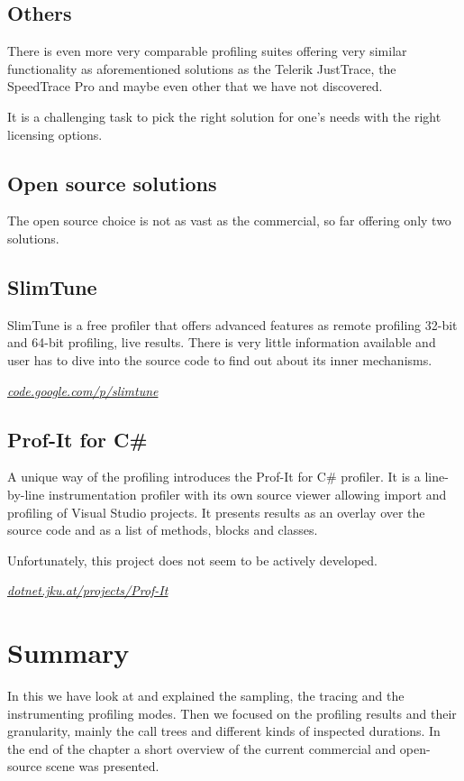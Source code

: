 \subsection{Others}
There is even more very comparable profiling suites offering very similar functionality as aforementioned solutions as the Telerik JustTrace, the SpeedTrace Pro and maybe even other that we have not discovered.

It is a challenging task to pick the right solution for one's needs with the right licensing options.

\subsection*{Open source solutions}
The open source choice is not as vast as the commercial, so far offering only two solutions.

\subsection{SlimTune}
SlimTune is a free profiler that offers advanced features as remote profiling 32-bit and 64-bit profiling, live results. There is very little information available and user has to dive into the source code to find out about its inner mechanisms.

\textit{\href{http://code.google.com/p/slimtune}{code.google.com/p/slimtune}}

\subsection{Prof-It for C\#}
A unique way of the profiling introduces the Prof-It for C\# profiler. It is a line-by-line instrumentation profiler with its own source viewer allowing import and profiling of Visual Studio projects. It presents results as an overlay over the source code and as a list of methods, blocks and classes. 

Unfortunately, this project does not seem to be actively developed. 

\textit{\href{http://dotnet.jku.at/projects/Prof-It/}{dotnet.jku.at/projects/Prof-It}}

\section*{Summary}
In this we have look at and explained the sampling, the tracing and the instrumenting profiling modes. Then we focused on the profiling results and their granularity, mainly the call trees and different kinds of inspected durations. In the end of the chapter a short overview of the current commercial and open-source scene was presented.

 


